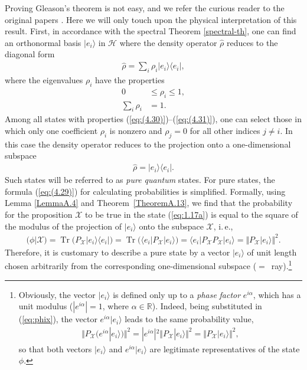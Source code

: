 \documentclass[nochecklpage]{stefan1}
\theoremstyle{definition}
\begin{document}
Proving Gleason's theorem is not easy, and we refer the curious reader
to the original papers \cite{Gleason,
Richman_Bridges}. Here we will only touch upon the physical
interpretation of this result. First, in accordance with the spectral
Theorem \ref{spectral-th}, one can find an orthonormal basis
$ |e_{i} \rangle $ in $ \mathscr{H} $ where the density operator
$ \hat{\rho } $ reduces to the diagonal form
%
\begin{align}
\hat{\rho } = \sum_{i} \rho_{i} |
e_{i} \rangle \langle e_{i} |, \label{eq:rho}
\end{align}
%
where the eigenvalues $ \rho_{i} $ have the properties
%
\begin{align}
0 &\leq \rho_{i} \leq 1, \label{eq:(4.30)}
\\
\sum_{i} \rho_{i} & = 1. \label{eq:(4.31)}
\end{align}
%
Among all states with properties (\ref{eq:(4.30)})--(\ref{eq:(4.31)}),
one can select those in which only one coefficient $ \rho_{i} $ is
nonzero
and $ \rho_{j} = 0 $ for all other indices $ j \neq i $. In this case
the density operator reduces to the projection onto a one-dimensional
subspace
%
\begin{align}
\hat{\rho }= |e_{i} \rangle \langle e_{i}|. \label{eq:1.17a}
\end{align}
%
Such states will be referred to as \emph{pure quantum}
states. For pure states, the formula
(\ref{eq:(4.29)}) for calculating probabilities is simplified. Formally,
using Lemma \ref{LemmaA.4} and Theorem~\ref{TheoremA.13}, we find that
the probability for the proposition $ \mathcal{X} $ to be true in the
state (\ref{eq:1.17a}) is equal to the square of the modulus of the
projection of $ | e_{i} \rangle $ onto the subspace $ \mathscr{X} $,
i.\,e.,
%
\begin{align}
(\phi |\mathcal{X}) = \operatorname{Tr} \bigl(P_{\mathscr{X}} |e_{i} \rangle
\langle e _{i}|\bigr) = \operatorname{Tr} \bigl(\langle e_{i}|
P_{\mathscr{X}} |e_{i} \rangle \bigr) = \langle e_{i}|
P_{\mathscr{X}} P_{\mathscr{X}}|e_{i} \rangle = \Vert
P_{
\mathscr{X}}|e_{i}\rangle \Vert^{2}.
\label{eq:phix}
\end{align}
%
Therefore, it is customary to describe a pure state by a vector
$ | e_{i} \rangle $ of unit length chosen arbitrarily from the
corresponding one-dimensional subspace ($=$~ray).\footnote{Obviously,
the vector $ | e_{i} \rangle $ is defined only up to a \emph{phase}
\emph{factor} $ e^{i \alpha } $, which has a unit modulus ($ | e^{i \alpha
} | = 1 $, where $ \alpha \in \mathbb{R} $). Indeed, being substituted
in (\ref{eq:phix}), the vector $ e^{i \alpha } | e_{i} \rangle $ leads
to the same probability value,
%
\begin{align*}
\big\Vert P_{\mathscr{X}}\bigl(e^{i \alpha }|e_{i} \rangle \bigr)
\big\Vert^{2} = |e^{i
\alpha }|^{2} \Vert P_{\mathscr{X}}|e_{i}
\rangle \Vert^{2} = \Vert P_{\mathscr{X}}|e_{i} \rangle
\Vert^{2},
\end{align*}
%
so that both vectors $ | e_{i} \rangle $ and $ e^{i \alpha } | e_{i}
\rangle $ are legitimate representatives of the state $\phi $.}
\end{document}
